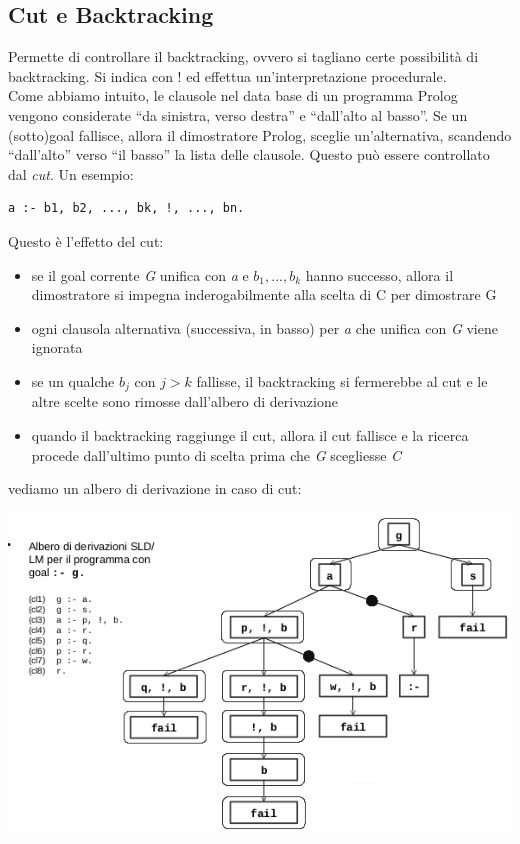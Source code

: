 \documentclass[a4paper,12pt, oneside]{book}
\begin{document}
\subsection{Cut e Backtracking}
Permette di controllare il backtracking, ovvero si tagliano certe possibilità di backtracking. Si indica con $!$ ed effettua un'interpretazione procedurale. \\
Come abbiamo intuito, le clausole nel data base di un programma
Prolog vengono considerate “da sinistra, verso destra” e “dall'alto al
basso”. Se un (sotto)goal fallisce, allora il dimostratore Prolog, sceglie un'alternativa, scandendo “dall'alto” verso “il basso” la lista delle clausole. Questo può essere controllato dal \textit{cut}. Un esempio:
\begin{verbatim}
a :- b1, b2, ..., bk, !, ..., bn.
\end{verbatim}
Questo è l'effetto del cut:
\begin{itemize}
\item se il goal corrente \textit{G} unifica con \textit{a} e $b_1,...,b_k$ hanno successo, allora il dimostratore si impegna inderogabilmente alla scelta di C per dimostrare G
\item ogni clausola alternativa (successiva, in basso) per \textit{a} che unifica con \textit{G} viene ignorata
\item se un qualche $b_j$ con $j > k$ fallisse, il backtracking si fermerebbe al cut e le altre scelte sono rimosse dall'albero di derivazione
\item quando il backtracking raggiunge il cut, allora il cut fallisce e la ricerca procede dall’ultimo punto di scelta prima che \textit{G} scegliesse \textit{C}
\end{itemize}
vediamo un albero di derivazione in caso di cut:
\begin{center}
	\includegraphics[scale=0.8]{img/cut.png}
\end{center}
\end{document}
